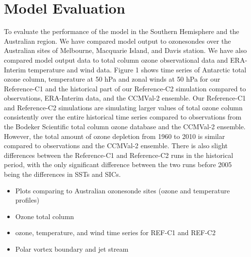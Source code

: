 \section{Model Evaluation}
To evaluate the performance of the model in the Southern Hemisphere and the Australian region. We have compared model output to ozonesondes over the Australian sites of Melbourne, Macquarie Island, and Davis station. We have also compared model output data to total column ozone observational data and ERA-Interim temperature and wind data. 
Figure 1 shows time series of Antarctic total ozone column, temperature at 50 hPa and zonal winds at 50 hPa for our Reference-C1 and the historical part of our Reference-C2 simulation compared to observations, ERA-Interim data, and the CCMVal-2 ensemble. Our Reference-C1 and Reference-C2 simulations are simulating larger values of total ozone column consistently over the entire historical time series compared to observations from the Bodeker Scientific total column ozone database and the CCMVal-2 ensemble. However, the total amount of ozone depletion from 1960 to 2010 is similar compared to observations and the CCMVal-2 ensemble. There is also slight differences between the Reference-C1 and Reference-C2 runs in the historical period, with the only significant difference between the two runs before 2005 being the differences in SSTs and SICs.

\begin{itemize}
\item Plots comparing to Australian ozonesonde sites (ozone and temperature profiles)
\item Ozone total column
\item ozone, temperature, and wind time series for REF-C1 and REF-C2
\item Polar vortex boundary and jet stream
\end{itemize}